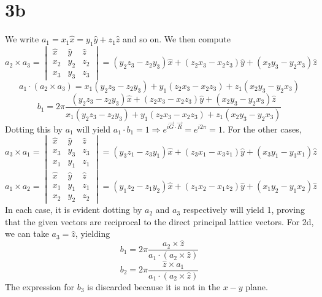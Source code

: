\documentclass{article}
\begin{document}
\section*{3b}
We write ${a}_{1}=x_{1}\hat{x}=y_{1}\hat{y}+z_{1}\hat{z}$ and so on. We then compute
\[
  {a_{2}\times a_{3}}=
  \begin{vmatrix}
    \hat{x} & \hat{y} & \hat{z} \\
    x_{2} & y_{2} & z_{2} \\
    x_{3} & y_{3} & z_{3}
  \end{vmatrix}
  =(y_{2}z_{3}-z_{2}y_{3})\hat{x}+(z_{2}x_{3}-x_{2}z_{3})\hat{y}+(x_{2}y_{3}-y_{2}x_{3})\hat{z}
\]
\[
  a_{1}\cdot(a_{2}\times a_{3})
  =x_{1}(y_{2}z_{3}-z_{2}y_{3})+y_{1}(z_{2}x_{3}-x_{2}z_{3})+z_{1}(x_{2}y_{3}-y_{2}x_{3})
\]
\[
  b_{1}=2\pi\frac{(y_{2}z_{3}-z_{2}y_{3})\hat{x}+(z_{2}x_{3}-x_{2}z_{3})\hat{y}+(x_{2}y_{3}-y_{2}x_{3})\hat{z}}
  {x_{1}(y_{2}z_{3}-z_{2}y_{3})+y_{1}(z_{2}x_{3}-x_{2}z_{3})+z_{1}(x_{2}y_{3}-y_{2}x_{3})}
\]
Dotting this by $a_{1}$ will yield $a_{1}\cdot b_{1}=1\Rightarrow e^{i\vec{G}\cdot\vec{R}}=e^{i2\pi}=1$.
For the other cases,
\[
  {a_{3}\times a_{1}}=
  \begin{vmatrix}
    \hat{x} & \hat{y} & \hat{z} \\
    x_{3} & y_{3} & z_{3} \\
    x_{1} & y_{1} & z_{1}
  \end{vmatrix}
  =(y_{3}z_{1}-z_{3}y_{1})\hat{x}+(z_{3}x_{1}-x_{3}z_{1})\hat{y}+(x_{3}y_{1}-y_{3}x_{1})\hat{z}
\]
\[
  {a_{1}\times a_{2}}=
  \begin{vmatrix}
    \hat{x} & \hat{y} & \hat{z} \\
    x_{1} & y_{1} & z_{1} \\
    x_{2} & y_{2} & z_{2}
  \end{vmatrix}
  =(y_{1}z_{2}-z_{1}y_{2})\hat{x}+(z_{1}x_{2}-x_{1}z_{2})\hat{y}+(x_{1}y_{2}-y_{1}x_{2})\hat{z}
\]
In each case, it is evident dotting by $a_{2}$ and $a_{3}$ respectively will yield 1, proving that the given vectors are reciprocal
to the direct principal lattice vectors.
For 2d, we can take $a_{3}=\hat{z}$, yielding
\[
  b_{1}=2\pi\frac{a_{2}\times\hat{z}}{a_{1}\cdot(a_{2}\times \hat{z})}
\]
\[
  b_{2}=2\pi\frac{\hat{z}\times a_{1}}{a_{1}\cdot(a_{2}\times \hat{z})}
\]
The expression for $b_{3}$ is discarded because it is not in the $x-y$ plane.
\end{document}

